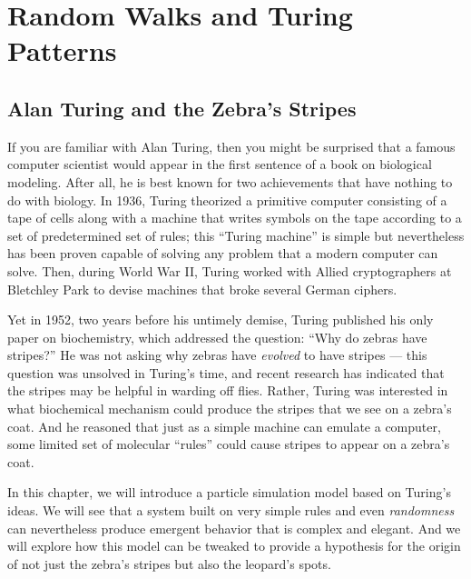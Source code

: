 \chapter[Random Walks and Turing Patterns]{Random Walks and Turing Patterns}
\label{chapter:turing}
\renewcommand{\chaptertitle}{Random Walks and Turing Patterns}

\FloatBarrier

\section{Alan Turing and the Zebra’s Stripes}
\label{sec:introduction}

If you are familiar with Alan Turing, then you might be surprised that a famous computer scientist would appear in the first sentence of a book on biological modeling. After all, he is best known for two achievements that have nothing to do with biology. In 1936, Turing theorized a primitive computer consisting of a tape of cells along with a machine that writes symbols on the tape according to a set of predetermined set of rules; this ``Turing machine'' is simple but nevertheless has been proven capable of solving any problem that a modern computer can solve.  Then, during World War II, Turing worked with Allied cryptographers at Bletchley Park to devise machines that broke several German ciphers.

Yet in 1952, two years before his untimely demise, Turing published his only paper on biochemistry, which addressed the question: “Why do zebras have stripes?” He was not asking why zebras have \textit{evolved} to have stripes --- this question was unsolved in Turing's time, and recent research has indicated that the stripes may be helpful in warding off flies. Rather, Turing was interested in what biochemical mechanism could produce the stripes that we see on a zebra's coat. And he reasoned that just as a simple machine can emulate a computer, some limited set of molecular ``rules'' could cause stripes to appear on a zebra's coat.

In this chapter, we will introduce a particle simulation model based on Turing's ideas. We will see that a system built on very simple rules and even \textit{randomness} can nevertheless produce emergent behavior that is complex and elegant. And we will explore how this model can be tweaked to provide a hypothesis for the origin of not just the zebra's stripes but also the leopard's spots.\\

